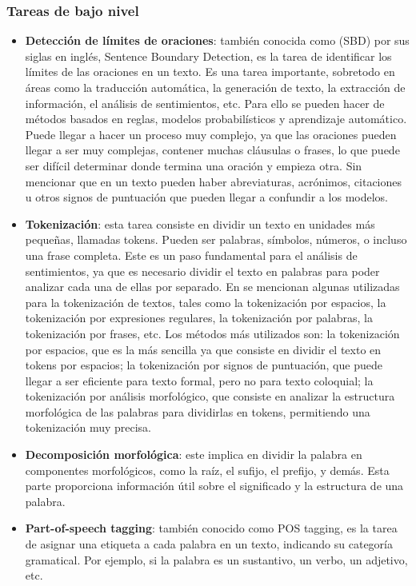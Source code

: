 \documentclass[12pt, conference]{IEEEtran}
\begin{document}
\subsubsection{Tareas de bajo nivel}
\begin{itemize}
  \item \textbf{Detección de límites de oraciones}: también conocida como (SBD) por sus siglas en inglés, Sentence Boundary Detection, es la tarea de identificar los límites de las oraciones en un texto.
  Es una tarea importante, sobretodo en áreas como la traducción automática, la generación de texto, la extracción de información, el análisis de sentimientos, etc. Para ello se pueden hacer de métodos basados en reglas, modelos probabilísticos y aprendizaje automático.
  Puede llegar a hacer un proceso muy complejo, ya que las oraciones pueden llegar a ser muy complejas, contener muchas cláusulas o frases, lo que puede ser difícil determinar donde termina una oración y empieza otra.
  Sin mencionar que en un texto pueden haber abreviaturas, acrónimos, citaciones u otros signos de puntuación que pueden llegar a confundir a los modelos.
  \item \textbf{Tokenización}: esta tarea consiste en dividir un texto en unidades más pequeñas, llamadas tokens. Pueden ser palabras, símbolos, números, o incluso una frase completa.
  Este es un paso fundamental para el análisis de sentimientos, ya que es necesario dividir el texto en palabras para poder analizar cada una de ellas por separado. En \cite{b9} se mencionan algunas utilizadas para la tokenización de textos, tales como la tokenización por espacios, la tokenización por expresiones regulares, la tokenización por palabras, la tokenización por frases, etc.
  Los métodos más utilizados son: la tokenización por espacios, que es la más sencilla ya que consiste en dividir el texto en tokens por espacios; la tokenización por signos de puntuación, que puede llegar a ser eficiente para texto formal, pero no para texto coloquial; la tokenización por análisis morfológico, que consiste en analizar la estructura morfológica de las palabras para dividirlas en tokens, permitiendo una tokenización muy precisa.
  \item \textbf{Decomposición morfológica}: este implica en dividir la palabra en componentes morfológicos, como la raíz, el sufijo, el prefijo, y demás. Esta parte proporciona información útil sobre el significado y la estructura de una palabra.
  \item \textbf{Part-of-speech tagging}: también conocido como POS tagging, es la tarea de asignar una etiqueta a cada palabra en un texto, indicando su categoría gramatical. Por ejemplo, si la palabra es un sustantivo, un verbo, un adjetivo, etc.

\end{itemize}
\end{document}
